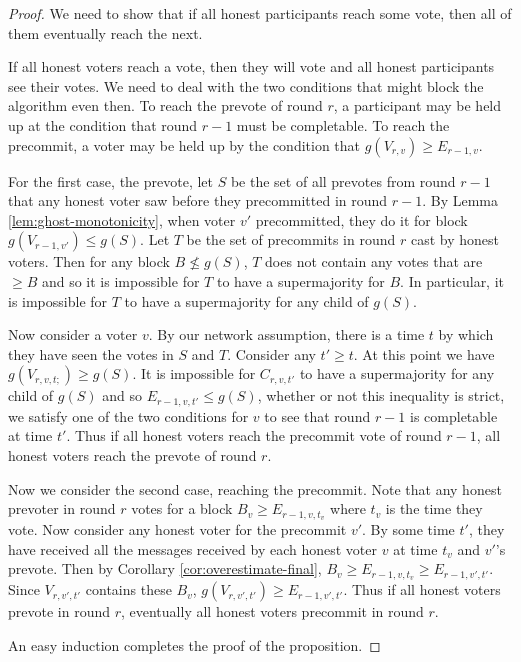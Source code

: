 \documentclass[a4paper,UKenglish,cleveref, autoref, thm-restate, anonymous]{lipics-v2019}
\begin{document}
\begin{proof} We need to show that if all honest participants reach some vote, then all of them eventually reach the next.

If all honest voters reach a vote, then they will vote and all honest participants see their votes. We need to deal with the two conditions that might block the algorithm even then.
To reach the prevote of round $r$, a participant may be held up at the condition that round $r-1$ must be completable. To reach the precommit, a voter may be held up by the condition that $g(V_{r,v}) \geq E_{r-1,v}$.

For the first case, the prevote, let $S$ be the set of all prevotes from round $r-1$ that any honest voter saw before they precommitted in round $r-1$.
By Lemma \ref{lem:ghost-monotonicity}, when voter $v'$ precommitted, they do it for block $g(V_{r-1,v'}) \leq g(S)$.
Let $T$ be the set of precommits in round $r$ cast by honest voters.
Then for any block $B \not\leq g(S)$, $T$ does not contain any votes that are $\geq B$ and so it is impossible for $T$ to have a supermajority for $B$.
In particular, it is impossible for $T$ to have a supermajority for any child of $g(S)$. 

Now consider a voter $v$. By our network assumption, there is a time $t$ by which they have seen the votes in $S$ and $T$. Consider any $t' \geq t$.
At this point we have $g(V_{r,v,t;}) \geq g(S)$. It is impossible for $C_{r,v,t'}$ to have a supermajority for any child of $g(S)$ and so $E_{r-1,v,t'} \leq g(S)$, whether or not this inequality is strict, we satisfy one of the two conditions for $v$ to see that round $r-1$ is completable at time $t'$.
Thus if all honest voters reach the precommit vote of round $r-1$, all honest voters reach the prevote of round $r$.

Now we consider the second case, reaching the precommit. 
Note that any honest prevoter in round $r$ votes for a block $B_v \geq E_{r-1,v,t_v}$ where $t_v$ is the time they vote. Now consider any honest voter for the precommit $v'$. By some time $t'$, they have received all the messages received by each honest voter $v$ at time $t_v$ and $v'$'s prevote. 
Then by Corollary \ref{cor:overestimate-final}, $B_v \geq E_{r-1,v,t_v} \geq E_{r-1,v',t'}$. Since $V_{r,v',t'}$ contains these $B_v$, $g(V_{r,v',t'}) \geq  E_{r-1,v',t'}$. Thus if all honest voters prevote in round $r$, eventually all honest voters precommit in round $r$.

An easy induction completes the proof of the proposition.
\end{proof}
\end{document}
